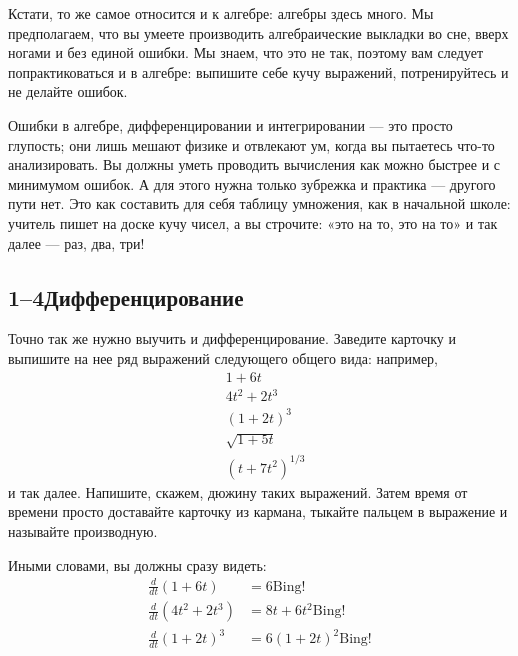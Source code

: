 \documentclass[11pt,oneside]{article}
\providecommand{\ddt}[2]{\frac{d#1}{d#2}}
\begin{document}
Кстати, то же самое относится и к алгебре: алгебры здесь много. Мы предполагаем, что вы умеете производить алгебраические выкладки во сне, вверх ногами и без единой ошибки. Мы знаем, что это не так, поэтому вам следует попрактиковаться и в алгебре: выпишите себе кучу выражений, потренируйтесь и не делайте ошибок.\par

Ошибки в алгебре, дифференцировании и интегрировании --- это просто глупость; они лишь мешают физике и отвлекают ум, когда вы пытаетесь что-то анализировать. Вы должны уметь проводить вычисления как можно быстрее и с минимумом ошибок. А для этого нужна только зубрежка и практика --- другого пути нет. Это как составить для себя таблицу умножения, как в начальной школе: учитель пишет на доске кучу чисел, а вы строчите: «это на то, это на то» и так далее --- раз, два, три!\par

\subsection*{1--4Дифференцирование}

Точно так же нужно выучить и дифференцирование. Заведите карточку и выпишите на нее ряд выражений следующего общего вида: например, 
\begin{equation*} \begin{aligned} &1+6t\\[.5ex] &4t^2+2t^3\\[.5ex] &(1+2t)^3\\[.5ex] &\sqrt{1+5t}\\[.5ex] &(t+7t^2)^{1/3} \end{aligned} \tag{1.1}
\label{Eq:TIPS:1:1} \end{equation*}
 и так далее. Напишите, скажем, дюжину таких выражений. Затем время от времени просто доставайте карточку из кармана, тыкайте пальцем в выражение и называйте производную.\par

Иными словами, вы должны сразу видеть: 
\begin{equation*} \begin{aligned} \ddt{}{t}(1+6t) &= 6 \mathrm{ Bing!}\\[1ex] \ddt{}{t}(4t^2+2t^3) &= 8t+6t^2 \mathrm{ Bing!}\\[1ex] \ddt{}{t}(1+2t)^3 &= 6(1+2t)^2 \mathrm{ Bing!} \end{aligned} \tag{1.2}
\label{Eq:TIPS:1:2} \end{equation*}
\par
\end{document}
